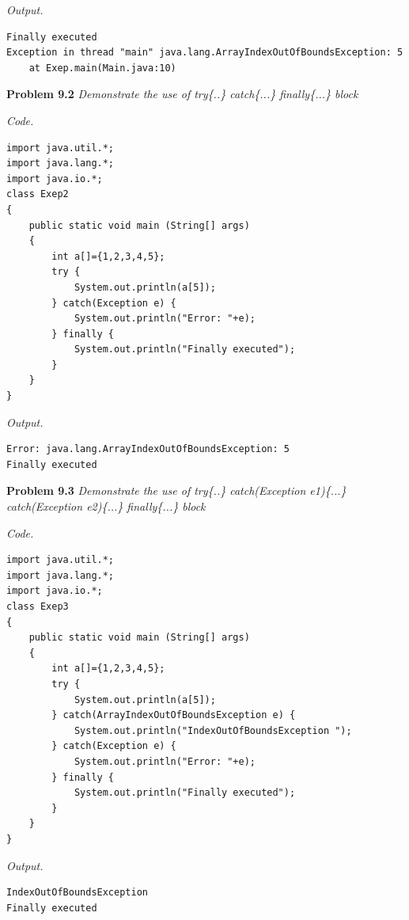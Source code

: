 \documentclass[12pt]{article}
\begin{document}
\textit{Output.}
\begin{lstlisting}
Finally executed
Exception in thread "main" java.lang.ArrayIndexOutOfBoundsException: 5
	at Exep.main(Main.java:10)
\end{lstlisting}

\textbf{Problem 9.2} \textit{Demonstrate the use of try\{..\} catch\{...\} finally\{...\} block}

\textit{Code.}
\begin{lstlisting}
import java.util.*;
import java.lang.*;
import java.io.*;
class Exep2
{
	public static void main (String[] args)
	{
		int a[]={1,2,3,4,5};
		try {
		    System.out.println(a[5]);
		} catch(Exception e) {
		    System.out.println("Error: "+e);
		} finally {
		    System.out.println("Finally executed");
		}
	}
}
\end{lstlisting}

\textit{Output.}
\begin{lstlisting}
Error: java.lang.ArrayIndexOutOfBoundsException: 5
Finally executed
\end{lstlisting}

\textbf{Problem 9.3} \textit{Demonstrate the use of try\{..\} catch(Exception e1)\{...\} catch(Exception e2)\{...\} finally\{...\} block}

\textit{Code.}
\begin{lstlisting}
import java.util.*;
import java.lang.*;
import java.io.*;
class Exep3
{
	public static void main (String[] args)
	{
		int a[]={1,2,3,4,5};
		try {
		    System.out.println(a[5]);
		} catch(ArrayIndexOutOfBoundsException e) {
		    System.out.println("IndexOutOfBoundsException ");
		} catch(Exception e) {
		    System.out.println("Error: "+e);
		} finally {
		    System.out.println("Finally executed");
		}
	}
}
\end{lstlisting}

\textit{Output.}
\begin{lstlisting}
IndexOutOfBoundsException 
Finally executed
\end{lstlisting}


\end{document}
